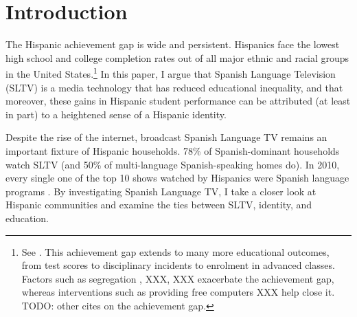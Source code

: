 \documentclass[11pt]{article}
\begin{document}
\thispagestyle{empty}

\newpage 
\renewcommand{\thefootnote}{\arabic{footnote}}

\pagebreak 
\setcounter{page}{0}


\onehalfspacing


\newpage

\setcounter{page}{1}
\section{Introduction}


The Hispanic achievement gap is wide and persistent. Hispanics face the lowest high school and college completion rates out of all major ethnic and racial groups in the United States.\footnote{See \cite{tienda_hispanicity_2009}. This achievement gap extends to many more educational outcomes, from test scores to disciplinary incidents to enrolment in advanced classes. Factors such as segregation \citep{cascio_cracks_2012}, XXX, XXX exacerbate the achievement gap, whereas interventions such as providing free computers \citep{fairlie2012academic} XXX help close it.  TODO: other cites on the achievement gap. } In this paper, I argue that Spanish Language Television (SLTV) is a media technology that has reduced educational inequality, and that moreover, these gains in Hispanic student performance can be attributed (at least in part) to a heightened sense of a Hispanic identity.

Despite the rise of the internet, broadcast Spanish Language TV remains an important fixture of Hispanic households. 78\% of Spanish-dominant households watch SLTV (and 50\% of multi-language Spanish-speaking homes do). In 2010, every single one of the top 10 shows watched by Hispanics were Spanish language programs \citep{pardo_three_2011}. By investigating Spanish Language TV, I take a closer look at Hispanic communities and examine the ties between SLTV, identity, and education. 
\end{document}
